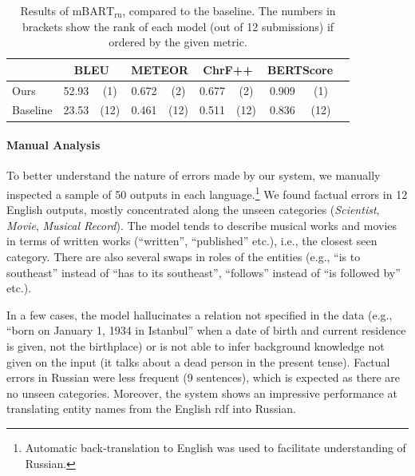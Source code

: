 \begin{table}[t]
    \footnotesize\centering
    \begin{tabular}{llcccccccc}\toprule
                 & \multicolumn{2}{c}{\bf BLEU} & \multicolumn{2}{c}{\bf METEOR} & \multicolumn{2}{c}{\bf ChrF++} & \multicolumn{2}{c}{\bf BERTScore}                               \\\midrule
        Ours     & 52.93                        & (1)                            & 0.672                          & (2)                               & 0.677 & (2)  & 0.909 & (1)  \\
        Baseline & 23.53                        & (12)                           & 0.461                          & (12)                              & 0.511 & (12) & 0.836 & (12) \\\bottomrule
    \end{tabular}
    \caption{Results of $\text{mBART}_{\text{ru}}$, compared to the baseline. The numbers in brackets show the rank of each model (out of 12 submissions) if ordered by the given metric.}
    \label{tab:mbart:results-ru}
\end{table}

\paragraph{Manual Analysis}
To better understand the nature of errors made by our system, we manually inspected a sample of 50 outputs in each language.\footnote{Automatic back-translation to English was used to facilitate understanding of Russian.} We found factual errors in 12 English outputs, mostly concentrated along the unseen categories (\emph{Scientist}, \emph{Movie}, \emph{Musical Record}). The model tends to describe musical works and movies in terms of written works (“written”, “published” etc.), i.e., the closest seen category. There are also several swaps in roles of the entities (e.g., “is to southeast” instead of “has to its southeast”, “follows” instead of “is followed by” etc.).

In a few cases, the model hallucinates a relation not specified in the data (e.g., “born on January 1, 1934 in Istanbul” when a date of birth and current residence is given, not the birthplace) or is not able to infer background knowledge not given on the input (it talks about a dead person in the present tense).
Factual errors in Russian were less frequent (9 sentences), which is expected as there are no unseen categories. Moreover, the system shows an impressive performance at translating entity names from the English \ac{rdf} into Russian.

